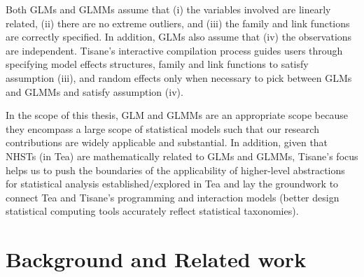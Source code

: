Both GLMs and GLMMs assume that (i) the variables involved are linearly related,
(ii) there are no extreme outliers, and (iii) the family and link functions are
correctly specified. In addition, GLMs also assume that (iv) the observations
are independent. Tisane's interactive compilation process guides users through
specifying model effects structures, family and link functions to satisfy
assumption (iii), and random effects only when necessary to pick between GLMs
and GLMMs and satisfy assumption (iv).

In the scope of this thesis, GLM and GLMMs are an appropriate scope because they
encompass a large scope of statistical models such that our research
contributions are widely applicable and substantial. In addition, given that
NHSTs (in Tea) are mathematically related to GLMs and GLMMs, Tisane's focus
helps us to push the boundaries of the applicability of higher-level
abstractions for statistical analysis established/explored in Tea and lay the
groundwork to connect Tea and Tisane's programming and interaction models
(better design statistical computing tools accurately reflect statistical
taxonomies).

\section{Background and Related work}
